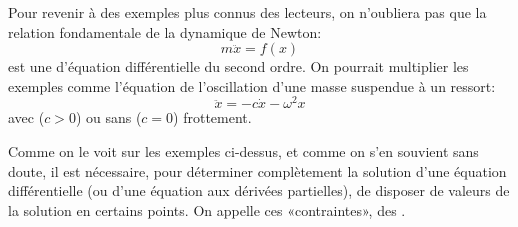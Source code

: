 \medskip
Pour revenir à des exemples plus connus des lecteurs, on n'oubliera pas que la relation fondamentale de la dynamique de Newton: 
\begin{equation} m\ddot{x}=f(x)
\end{equation}
est une d'équation différentielle du second ordre.
On pourrait multiplier les exemples comme l'équation de l'oscillation d'une masse suspendue à un ressort:
\begin{equation}
\ddot{x} = - c \dot{x} - \omega^2x 
\end{equation}%
avec ($c>0$) ou sans ($c=0$) frottement.

\medskip
Comme on le voit sur les exemples ci-dessus, et comme on s'en souvient sans doute, il est nécessaire, pour déterminer complètement la solution d'une équation différentielle (ou d'une équation aux dérivées partielles), de disposer de valeurs de la solution en certains points. On appelle ces «contraintes», des .


